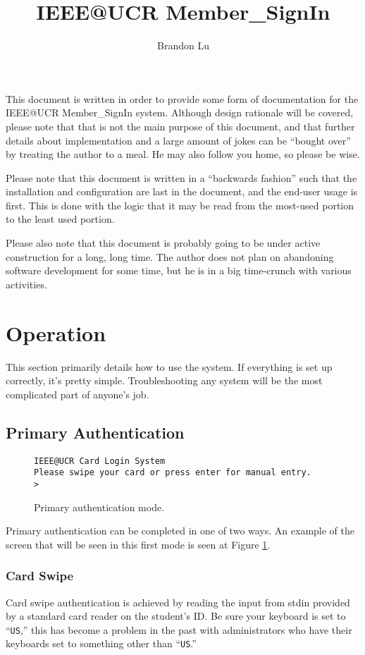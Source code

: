 \documentclass[12pt]{article}
\begin{document}
\title{IEEE@UCR Member\_SignIn}
\author{Brandon Lu}
\maketitle

This document is written in order to provide some form of documentation for
the IEEE@UCR Member\_SignIn system.  Although design rationale will be
covered, please note that that is not the main purpose of this document,
and that further details about implementation and a large amount of jokes
can be ``bought over'' by treating the author to a meal.  He may also follow
you home, so please be wise.

Please note that this document is written in a ``backwards fashion'' such that
the installation and configuration are last in the document, and the end-user
usage is first.
This is done with the 
logic that it may be read from the most-used portion to the least used
portion.

Please also note that this document is probably going to be under active
construction for a long, long time.  The author does not plan on abandoning
software development for some time, but he is in a big time-crunch with
various activities.
\newpage

\section{Operation}
This section primarily details how to use the system.  If everything is set up
correctly, it's pretty simple.  Troubleshooting any system will be the most
complicated part of anyone's job.

\subsection{Primary Authentication}
\begin{figure}[h]
{\tt IEEE@UCR Card Login System\\
Please swipe your card or press enter for manual entry.\\
> }
\caption{Primary authentication mode.}
\label{fig:pauth}
\end{figure}
Primary authentication can be completed in one of two ways.  An example of
the screen that will be seen in this first mode is seen at Figure
\ref{fig:pauth}.
\subsubsection{Card Swipe}
Card swipe authentication is achieved by reading the input from stdin provided
by a standard card reader on the student's ID.  Be sure your keyboard is set
to ``{\tt US},'' this has become a problem in the past with administrators who have
their keyboards set to something other than ``{\tt US}.''
\end{document}
